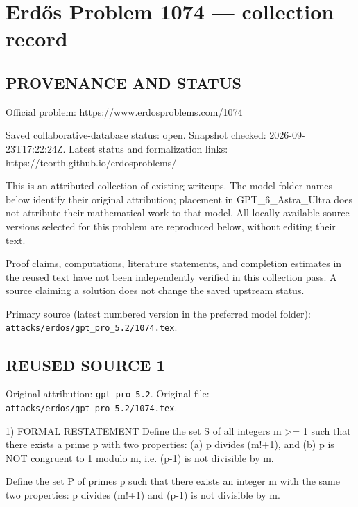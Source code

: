 \section*{Erd\H{o}s Problem 1074 --- collection record}

\subsection*{PROVENANCE AND STATUS}
Official problem: https://www.erdosproblems.com/1074

Saved collaborative-database status: open.
Snapshot checked: 2026-09-23T17:22:24Z.
Latest status and formalization links: https://teorth.github.io/erdosproblems/

This is an attributed collection of existing writeups. The model-folder names below identify their original attribution; placement in GPT\_6\_Astra\_Ultra does not attribute their mathematical work to that model. All locally available source versions selected for this problem are reproduced below, without editing their text.

Proof claims, computations, literature statements, and completion estimates in the reused text have not been independently verified in this collection pass. A source claiming a solution does not change the saved upstream status.

Primary source (latest numbered version in the preferred model folder): \texttt{attacks/erdos/gpt\_pro\_5.2/1074.tex}.

\subsection*{REUSED SOURCE 1}
Original attribution: \texttt{gpt\_pro\_5.2}.
Original file: \texttt{attacks/erdos/gpt\_pro\_5.2/1074.tex}.


1) FORMAL RESTATEMENT
Define the set S of all integers m >= 1 such that there exists a prime p with two properties:
  (a) p divides (m!+1), and
  (b) p is NOT congruent to 1 modulo m, i.e. (p-1) is not divisible by m.

Define the set P of primes p such that there exists an integer m with the same two properties:
  p divides (m!+1) and (p-1) is not divisible by m.

